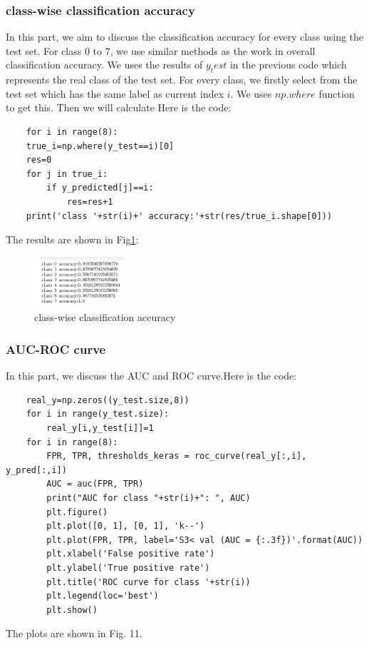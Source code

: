 \documentclass[conference]{IEEEtran}
\begin{document}
\subsubsection{class-wise classification accuracy}
In this part, we aim to discuss the classification accuracy for every class using the test set. 
For class $0$ to $7$, we use similar methods as the work in overall classification accuracy. 
We uses the results of $y_test$ in the previous code which represents the real class of the test set. For every class, we firstly select from the test set which has the same label as current index $i$.
We uses $np.where$ function to get this. Then we will calculate
Here is the code:
\begin{lstlisting}
    for i in range(8):
    true_i=np.where(y_test==i)[0]
    res=0
    for j in true_i:
        if y_predicted[j]==i:
            res=res+1
    print('class '+str(i)+' accuracy:'+str(res/true_i.shape[0]))
\end{lstlisting}
The results are shown in Fig\ref{Fig.t3q2}:
\begin{figure}[h] 
    \centering
    \includegraphics[width=0.3\textwidth]{T3Q1b.png}
    \caption{class-wise classification accuracy} 
    \label{Fig.t3q2} 
\end{figure}
\subsubsection{AUC-ROC curve}
In this part, we discuss the AUC and ROC curve.Here is the code:
\begin{lstlisting}
    real_y=np.zeros((y_test.size,8))
    for i in range(y_test.size):
        real_y[i,y_test[i]]=1
    for i in range(8):
        FPR, TPR, thresholds_keras = roc_curve(real_y[:,i], y_pred[:,i]) 
        AUC = auc(FPR, TPR)  
        print("AUC for class "+str(i)+": ", AUC)
        plt.figure()
        plt.plot([0, 1], [0, 1], 'k--')
        plt.plot(FPR, TPR, label='S3< val (AUC = {:.3f})'.format(AUC))
        plt.xlabel('False positive rate')
        plt.ylabel('True positive rate')
        plt.title('ROC curve for class '+str(i))
        plt.legend(loc='best')
        plt.show()    
\end{lstlisting}

The plots are shown in Fig. 11.
\end{document}
